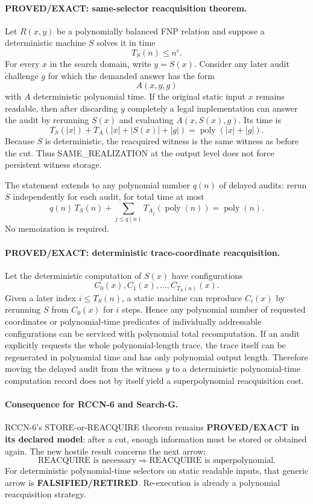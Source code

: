 \documentclass[11pt]{article}
\begin{document}
\paragraph{PROVED/EXACT: same-selector reacquisition theorem.}
Let $R(x,y)$ be a polynomially balanced FNP relation and suppose a deterministic machine $S$ solves it in time
\[
T_S(n)\le n^c.
\]
For every $x$ in the search domain, write $y=S(x)$. Consider any later audit challenge $g$ for which the demanded answer has the form
\[
A(x,y,g)
\]
with $A$ deterministic polynomial time. If the original static input $x$ remains readable, then after discarding $y$ completely a legal implementation can answer the audit by rerunning $S(x)$ and evaluating $A(x,S(x),g)$. Its time is
\[
\boxed{T_S(|x|)+T_A(|x|+|S(x)|+|g|)=\operatorname{poly}(|x|+|g|).}
\]
Because $S$ is deterministic, the reacquired witness is the same witness as before the cut. Thus SAME\_REALIZATION at the output level does not force persistent witness storage.

The statement extends to any polynomial number $q(n)$ of delayed audits: rerun $S$ independently for each audit, for total time at most
\[
\boxed{q(n)\,T_S(n)+\sum_{j\le q(n)}T_{A_j}(\operatorname{poly}(n))=\operatorname{poly}(n).}
\]
No memoization is required.

\paragraph{PROVED/EXACT: deterministic trace-coordinate reacquisition.}
Let the deterministic computation of $S(x)$ have configurations
\[
C_0(x),C_1(x),\ldots,C_{T_S(n)}(x).
\]
Given a later index $i\le T_S(n)$, a static machine can reproduce $C_i(x)$ by rerunning $S$ from $C_0(x)$ for $i$ steps. Hence any polynomial number of requested coordinates or polynomial-time predicates of individually addressable configurations can be serviced with polynomial total recomputation. If an audit explicitly requests the whole polynomial-length trace, the trace itself can be regenerated in polynomial time and has only polynomial output length. Therefore moving the delayed audit from the witness $y$ to a deterministic polynomial-time computation record does not by itself yield a superpolynomial reacquisition cost.

\paragraph{Consequence for RCCN-6 and Search-G.}
RCCN-6's STORE-or-REACQUIRE theorem remains \textbf{PROVED/EXACT in its declared model}: after a cut, enough information must be stored or obtained again. The new hostile result concerns the next arrow:
\[
\boxed{\text{REACQUIRE is necessary}\Longrightarrow\text{REACQUIRE is superpolynomial}.}
\]
For deterministic polynomial-time selectors on static readable inputs, that generic arrow is \textbf{FALSIFIED/RETIRED}. Re-execution is already a polynomial reacquisition strategy.
\end{document}
